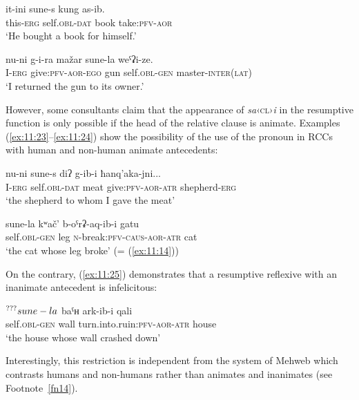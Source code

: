 ﻿\documentclass[output=paper]{langsci/langscibook}
\begin{document}
\ea \label{ex:11:21} %
\gll  it-ini sune-s kung as-ib.\\
  this-\textsc{erg} self.\textsc{obl}-\textsc{dat} book take:\textsc{pfv}-\textsc{aor}\\
  \glt   `He bought a book for himself.'
  
\ex \label{ex:11:22} %
\gll  nu-ni g-i-ra mažar sune-la weˤʡi-ze.\\
  I-\textsc{erg} give:\textsc{pfv}-\textsc{aor}-\textsc{ego} gun   self.\textsc{obl}-\textsc{gen} master-\textsc{inter}(\textsc{lat})\\
\glt   `I returned the gun to its owner.'
\z

However, some consultants claim that the appearance of
\emph{sa}‹\textsc{cl}›\emph{i} in the resumptive function is only
possible if the head of the relative clause is animate. Examples
(\ref{ex:11:23}–\ref{ex:11:24}) show the possibility of the use of the pronoun in RCCs with
human and non-human animate antecedents:

\ea \label{ex:11:23} %
\gll nu-ni sune-s diʔ g-ib-i ħanq'aka-jni...\\
  I-\textsc{erg} self.\textsc{obl}-\textsc{dat} meat give:\textsc{pfv}-\textsc{aor}-\textsc{atr}   shepherd-\textsc{erg}\\
\glt 
  `the shepherd to whom I gave the meat'

\ex \label{ex:11:24} %
\gll  sune-la kʷač' b-oˤrʡ-aq-ib-i gatu\\
  self.\textsc{obl}-\textsc{gen} leg \textsc{n}-break:\textsc{pfv}-\textsc{caus}-\textsc{aor}-\textsc{atr}  cat\\
\glt   `the cat whose leg broke' (= (\ref{ex:11:14}))
\z

On the contrary, (\ref{ex:11:25}) demonstrates that a resumptive reflexive with an
inanimate antecedent is infelicitous:

\ea \label{ex:11:25} %
\gll   \(\textsuperscript{???}sune-la\) baˤʜ ark-ib-i qali\\
  self.\textsc{obl}-\textsc{gen} wall turn.into.ruin:\textsc{pfv}-\textsc{aor}-\textsc{atr}   house\\
\glt   `the house whose wall crashed down'
\z

Interestingly, this restriction is independent from the  system of
Mehweb which contrasts humans and non-humans rather than animates and
inanimates (see Footnote~\ref{fn14}).
\end{document}
